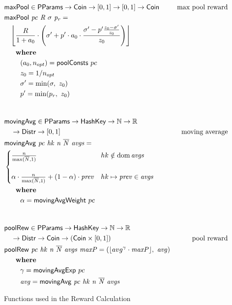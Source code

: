 \begin{figure}[htb]
  \begin{align*}
      & \fun{maxPool} \in \PParams \to \Coin \to [0, 1] \to [0,1] \to \Coin
      & \text{max pool reward} \\
      & \fun{maxPool}~\var{pc}~\var{R}~\sigma~\var{p_r} = \\
      & ~~~\floor*{
           \frac{R}{1 + a_0}
           \cdot
           \left(\sigma' + p'\cdot a_0\cdot\frac{\sigma' - p'\frac{z_0-\sigma'}{z_0}}{z_0}\right)} \\
      & ~~~\where \\
      & ~~~~~~~(a_0, n_{opt}) = \fun{poolConsts}~pc \\
      & ~~~~~~~z_0 = 1/n_{opt} \\
      & ~~~~~~~\sigma'=\min(\sigma,~z_0) \\
      & ~~~~~~~p'=\min(p_r,~z_0) \\
      \nextdef
      & \fun{movingAvg} \in \PParams \to \HashKey \to \mathbb{N} \to \mathbb{R} \\
      & ~~~\to \Distr \to [0, 1]
      & \text{moving average} \\
      & \fun{movingAvg}~\var{pc}~\var{hk}~\var{n}~\var{\overline{N}}~\var{avgs} = \\
      & \begin{cases}
        \frac{n}{\max(\overline{N}, 1)}
        & hk\notin \dom\var{avgs}\\
        \\
          \alpha\cdot\frac{n}{\max(\overline{N}, 1)}+(1-\alpha)\cdot\var{prev}
        & hk\mapsto\var{prev}\in\var{avgs}\\
        \end{cases} \\
      & ~~~\where \\
      & ~~~~~~~\alpha = \fun{movingAvgWeight}~pc \\
      \nextdef
      & \fun{poolRew} \in \PParams \to \HashKey \to \mathbb{N} \to \mathbb{R} \\
      & ~~~\to \Distr \to \Coin \to (\Coin \times [0, 1])
      & \text{pool reward} \\
      & \fun{poolRew}~\var{pc}~\var{hk}~\var{n}~\var{\overline{N}}~\var{avgs}~\var{maxP} =
      (\floor*{avg^\gamma\cdot \var{maxP}},~\var{avg})\\
      & ~~~\where \\
      & ~~~~~~~\gamma = \fun{movingAvgExp}~pc \\
      & ~~~~~~~\var{avg} = \fun{movingAvg}~\var{pc}~\var{hk}~\var{n}~\var{\overline{N}}~\var{avgs} \\
  \end{align*}
  \caption{Functions used in the Reward Calculation}
  \label{fig:functions:rewards}
\end{figure}

